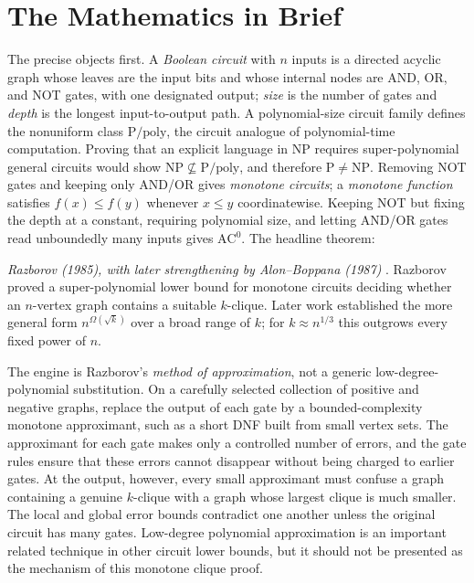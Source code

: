 \section{The Mathematics in Brief}
The precise objects first. A \emph{Boolean circuit} with $n$ inputs is a directed acyclic graph whose leaves are the input bits and whose internal nodes are AND, OR, and NOT gates, with one designated output; \emph{size} is the number of gates and \emph{depth} is the longest input-to-output path. A polynomial-size circuit family defines the nonuniform class $\mathrm{P}/\mathrm{poly}$, the circuit analogue of polynomial-time computation. Proving that an explicit language in $\mathrm{NP}$ requires super-polynomial general circuits would show $\mathrm{NP}\not\subseteq\mathrm{P}/\mathrm{poly}$, and therefore $\mathrm{P}\ne\mathrm{NP}$. Removing NOT gates and keeping only AND/OR gives \emph{monotone circuits}; a \emph{monotone function} satisfies $f(x)\le f(y)$ whenever $x\le y$ coordinatewise. Keeping NOT but fixing the depth at a constant, requiring polynomial size, and letting AND/OR gates read unboundedly many inputs gives $\mathrm{AC}^{0}$. The headline theorem:

\medskip
\noindent\emph{Razborov (1985), with later strengthening by Alon--Boppana (1987)} \cite{razborov-monotone,alon-boppana}. Razborov proved a super-polynomial lower bound for monotone circuits deciding whether an $n$-vertex graph contains a suitable $k$-clique. Later work established the more general form $n^{\Omega(\sqrt{k})}$ over a broad range of $k$; for $k\approx n^{1/3}$ this outgrows every fixed power of $n$.

The engine is Razborov's \emph{method of approximation}, not a generic low-degree-polynomial substitution. On a carefully selected collection of positive and negative graphs, replace the output of each gate by a bounded-complexity monotone approximant, such as a short DNF built from small vertex sets. The approximant for each gate makes only a controlled number of errors, and the gate rules ensure that these errors cannot disappear without being charged to earlier gates. At the output, however, every small approximant must confuse a graph containing a genuine $k$-clique with a graph whose largest clique is much smaller. The local and global error bounds contradict one another unless the original circuit has many gates. Low-degree polynomial approximation is an important related technique in other circuit lower bounds, but it should not be presented as the mechanism of this monotone clique proof.

